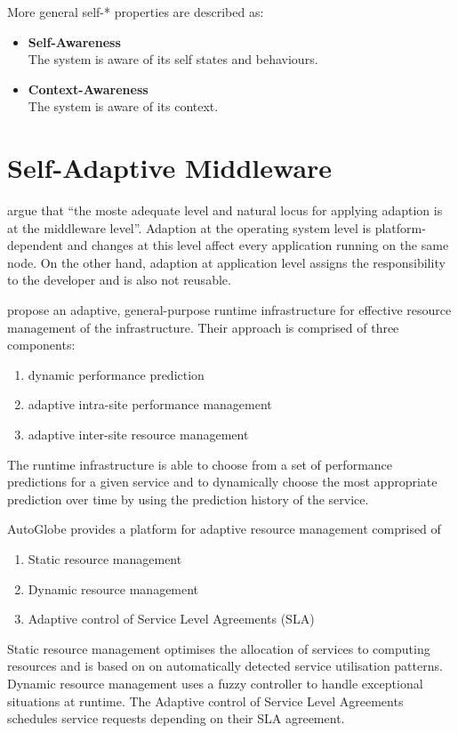 More general self-* properties are described as:
\begin{itemize}
	\item \textbf{Self-Awareness}\\
	The system is aware of its self states and behaviours.
	\item \textbf{Context-Awareness}\\
	The system is aware of its context.
\end{itemize}

\section{Self-Adaptive Middleware}

\citet{Duran-Limon:2004mi} argue that ``the moste adequate level and natural locus for applying adaption is at the middleware level''. Adaption at the operating system level is platform-dependent and changes at this level affect every application running on the same node. On the other hand, adaption at application level assigns the responsibility to the developer and is also not reusable.

\citet{Lee:2009vn} propose an adaptive, general-purpose runtime infrastructure for effective resource management of the infrastructure. Their approach is comprised of three components:
\begin{enumerate}
	\item dynamic performance prediction
	\item adaptive intra-site performance management
	\item adaptive inter-site resource management
\end{enumerate}

The runtime infrastructure is able to choose from a set of performance predictions for a given service and to dynamically choose the most appropriate prediction over time by using the prediction history of the service.

AutoGlobe \citep{Gmach:2008vo} provides a platform for adaptive resource management comprised of 
\begin{enumerate}
	\item Static resource management
	\item Dynamic resource management
	\item Adaptive control of Service Level Agreements (SLA)
\end{enumerate}
Static resource management optimises the allocation of services to computing resources and is based on on automatically detected service utilisation patterns. Dynamic resource management uses a fuzzy controller to handle exceptional situations at runtime. The Adaptive control of Service Level Agreements schedules service requests depending on their SLA agreement.

